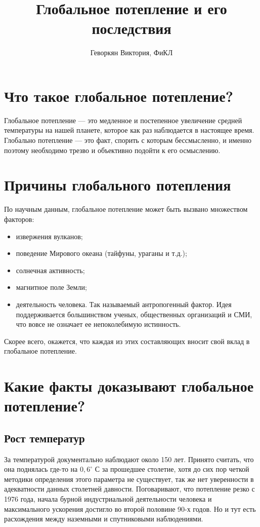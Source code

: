 \documentclass[a4paper,12pt]{ncc}
\title{Глобальное потепление и его последствия}
\author{Геворкян Виктория, ФиКЛ}
\begin{document}
 \maketitle{}
 \tableofcontents{}
 \section{Что такое глобальное потепление?}
 \label{sec:section}
 Глобальное потепление — это медленное и постепенное увеличение средней температуры на нашей планете, которое как раз наблюдается в настоящее время. Глобально потепление — это факт, спорить с которым бессмысленно, и именно поэтому необходимо трезво и объективно подойти к его осмыслению.
\section{Причины глобального потепления}
\label{sec:section}
 По научным данным, глобальное потепление может быть вызвано множеством факторов:
\begin{itemize}

\item извержения вулканов;
\item поведение Мирового океана (тайфуны, ураганы и т.д.);
\item солнечная активность;
\item магнитное поле Земли;
\item деятельность человека. Так называемый антропогенный фактор. Идея поддерживается большинством ученых, общественных организаций и СМИ, что вовсе не означает ее непоколебимую истинность.
\end{itemize}

Скорее всего, окажется, что каждая из этих составляющих вносит свой вклад в глобальное потепление.
 \section{Какие факты доказывают глобальное потепление?}
 \label{sec:section}
 
 \subsection{Рост температур}
 \label{sec:subsection}
За температурой документально наблюдают около 150 лет. Принято считать, что она поднялась где-то на $0,6^\circ$ С за прошедшее столетие, хотя до сих пор четкой методики определения этого параметра не существует, так же нет уверенности в адекватности данных столетней давности. Поговаривают, что потепление резко с 1976 года, начала бурной индустриальной деятельности человека и максимального ускорения достигло во второй половине 90-х годов. Но и тут есть расхождения между наземными и спутниковыми наблюдениями.
\end{document}
